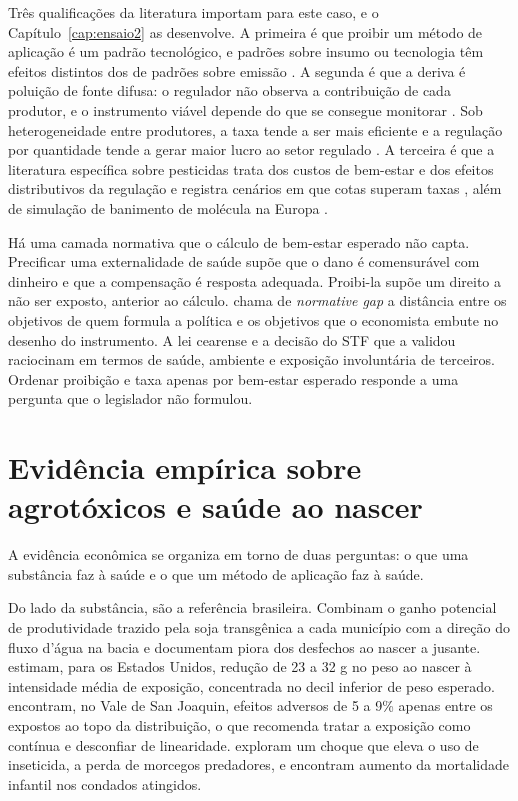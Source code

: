 Três qualificações da literatura importam para este caso, e o
Capítulo~\ref{cap:ensaio2} as desenvolve. A primeira é que proibir um método de
aplicação é um padrão tecnológico, e padrões sobre insumo ou tecnologia têm
efeitos distintos dos de padrões sobre emissão \cite{helfand1991}. A segunda é
que a deriva é poluição de fonte difusa: o regulador não observa a contribuição
de cada produtor, e o instrumento viável depende do que se consegue monitorar
\cite{segerson1988}. Sob heterogeneidade entre produtores, a taxa tende a ser
mais eficiente e a regulação por quantidade tende a gerar maior lucro ao setor
regulado \cite{helfand1995}. A terceira é que a literatura específica sobre
pesticidas trata dos custos de bem-estar e dos efeitos distributivos da
regulação \cite{lichtenberg1988,fernandezcornejo1998} e registra cenários em
que cotas superam taxas \cite{skevas2012}, além de simulação de banimento de
molécula na Europa \cite{bocker2020glyphosate}.

Há uma camada normativa que o cálculo de bem-estar esperado não capta.
Precificar uma externalidade de saúde supõe que o dano é comensurável com
dinheiro e que a compensação é resposta adequada. Proibi-la supõe um direito a
não ser exposto, anterior ao cálculo. \citet{hitzig2020normative} chama de
\emph{normative gap} a distância entre os objetivos de quem formula a política
e os objetivos que o economista embute no desenho do instrumento. A lei
cearense e a decisão do STF que a validou raciocinam em termos de saúde,
ambiente e exposição involuntária de terceiros. Ordenar proibição e taxa apenas
por bem-estar esperado responde a uma pergunta que o legislador não formulou.

\section{Evidência empírica sobre agrotóxicos e saúde ao nascer}
\label{sec:evidencia}

A evidência econômica se organiza em torno de duas perguntas: o que uma
substância faz à saúde e o que um método de aplicação faz à saúde.

Do lado da substância, \citet{dias2023down} são a referência brasileira.
Combinam o ganho potencial de produtividade trazido pela soja transgênica a
cada município com a direção do fluxo d'água na bacia e documentam piora dos
desfechos ao nascer a jusante. \citet{reynier2025glyphosate} estimam, para os
Estados Unidos, redução de 23 a 32 g no peso ao nascer à intensidade média de
exposição, concentrada no decil inferior de peso esperado.
\citet{larsen2017agricultural} encontram, no Vale de San Joaquin, efeitos
adversos de 5 a 9\% apenas entre os expostos ao topo da distribuição, o que
recomenda tratar a exposição como contínua e desconfiar de linearidade.
\citet{frank2024ecosystem} exploram um choque que eleva o uso de inseticida, a
perda de morcegos predadores, e encontram aumento da mortalidade infantil nos
condados atingidos.

